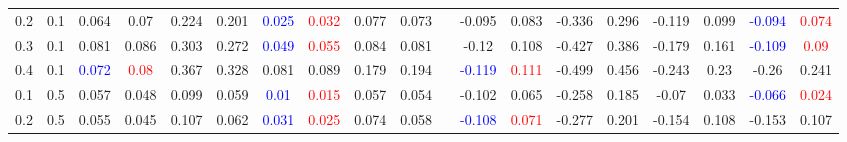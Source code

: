 \documentclass[specialist,
substylefile = spbu_report.rtx,
subf,href,colorlinks=true, 12pt]{disser}
\theoremstyle{definition}
\begin{document}
\begin{table}
{\begin{tabular}{m{1cm}m{1cm}ccccccccm{0.5cm}cccccccc}
			0.2 & 0.1    & 0.064                                   & 0.07                                       & 0.224                               & 0.201                       & \textcolor{blue}{0.025} & \textcolor{red}{0.032}                  & 0.077                                      & 0.073                    &                             & -0.095                   & 0.083                  & -0.336                   & 0.296      & -0.119                   & 0.099                   & \textcolor{blue}{-0.094} & \textcolor{red}{0.074} \\
			0.3 & 0.1    & 0.081                                   & 0.086                                      & 0.303                               & 0.272                       & \textcolor{blue}{0.049} & \textcolor{red}{0.055}                  & 0.084                                      & 0.081                    &                             & -0.12                    & 0.108                  & -0.427                   & 0.386      & -0.179                   & 0.161                   & \textcolor{blue}{-0.109} & \textcolor{red}{0.09}  \\
			0.4 & 0.1    & \textcolor{blue}{0.072}                 & \textcolor{red}{0.08}                      & 0.367                               & 0.328                       & 0.081                   & 0.089                                   & 0.179                                      & 0.194                    &                             & \textcolor{blue}{-0.119} & \textcolor{red}{0.111} & -0.499                   & 0.456      & -0.243                   & 0.23                    & -0.26                    & 0.241                  \\
			\hline
			0.1 & 0.5    & 0.057                                   & 0.048                                      & 0.099                               & 0.059                       & \textcolor{blue}{0.01}  & \textcolor{red}{0.015}                  & 0.057                                      & 0.054                    &                             & -0.102                   & 0.065                  & -0.258                   & 0.185      & -0.07                    & 0.033                   & \textcolor{blue}{-0.066} & \textcolor{red}{0.024} \\
			0.2 & 0.5    & 0.055                                   & 0.045                                      & 0.107                               & 0.062                       & \textcolor{blue}{0.031} & \textcolor{red}{0.025}                  & 0.074                                      & 0.058                    &                             & \textcolor{blue}{-0.108} & \textcolor{red}{0.071} & -0.277                   & 0.201      & -0.154                   & 0.108                   & -0.153                   & 0.107                  \\

\end{tabular}}
\end{table}
\end{document}

